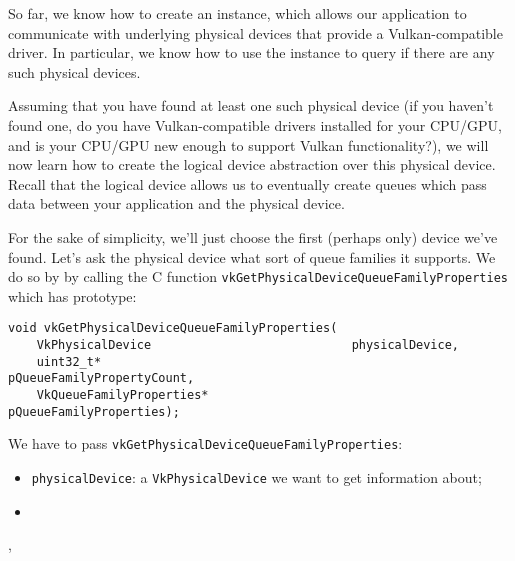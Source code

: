 \documentclass[12pt,letterpaper]{article}
\newcommand{\cil}[1]{\texttt{#1}}
\begin{document}
So far, we know how to create an instance, which allows our application to communicate with underlying physical devices that provide a Vulkan-compatible driver. In particular, we know how to use the instance to query if there are any such physical devices. 

Assuming that you have found at least one such physical device (if you haven't found one, do you have Vulkan-compatible drivers installed for your CPU/GPU, and is your CPU/GPU new enough to support Vulkan functionality?), we will now learn how to create the logical device abstraction over this physical device. Recall that the logical device allows us to eventually create queues which pass data between your application and the physical device. 

For the sake of simplicity, we'll just choose the first (perhaps only) device we've found. Let's ask the physical device what sort of queue families it supports. We do so by by calling the C function \cil{vkGetPhysicalDeviceQueueFamilyProperties} which has prototype:
	\begin{verbatim}
void vkGetPhysicalDeviceQueueFamilyProperties(
	VkPhysicalDevice                            physicalDevice,
	uint32_t*                                   pQueueFamilyPropertyCount,
	VkQueueFamilyProperties*                    pQueueFamilyProperties);
	\end{verbatim}
We have to pass \cil{vkGetPhysicalDeviceQueueFamilyProperties}:
	\begin{itemize}
		\item \cil{physicalDevice}: a \cil{VkPhysicalDevice} we want to get information about;
		
		\item 
	\end{itemize} , 
	
\end{document}
